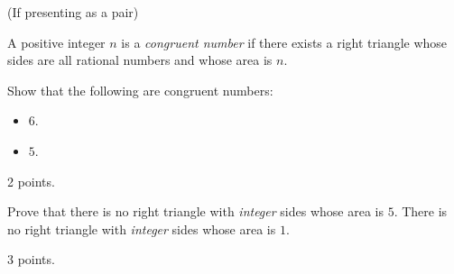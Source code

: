 \documentclass[letterpaper, 11 pt]{ximera}
\begin{document}
\begin{exploration}(If presenting as a pair)
 \begin{definition}
 A positive integer $n$ is a \emph{congruent number} if there exists a right triangle whose sides are all rational numbers and whose area is $n$. 
\end{definition}

\begin{problem}
Show that the following are congruent numbers:
\begin{itemize}
 \item $6$.
 \item $5$.
\end{itemize} 
\begin{rubric}
 2 points.
\end{rubric}
\end{problem}

\begin{problem}
Prove that there is no right triangle with \emph{integer} sides whose area is $5$.
 There is no right triangle with \emph{integer} sides whose area is $1$.
 \begin{rubric}
 3 points.
\end{rubric}
\end{problem}

\end{exploration}
\end{document}
